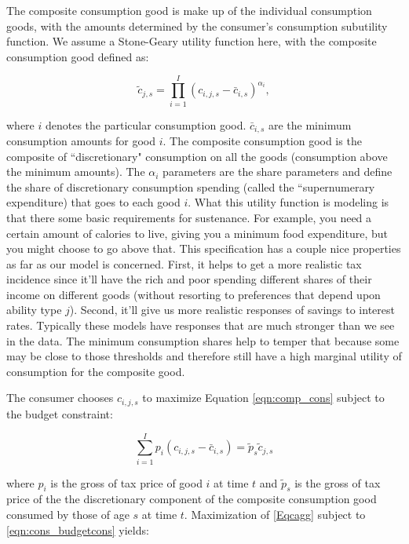 \documentclass[letterpaper,12pt]{article}
\theoremstyle{definition}
\begin{document}
\begin{spacing}{1.5}
  The composite consumption good is make up of the individual consumption goods, with the amounts determined by the consumer's consumption subutility function.  We assume a Stone-Geary utility function here, with the composite consumption good defined as: 
  
  \begin{equation} \label{eqn:comp_cons}
\tilde{c}_{j,s}  = \prod_{i=1}^I \left( c_{i,j,s} - \bar{c}_{i,s} \right) ^{\alpha_{i}}, 
 \end{equation}
 
 \noindent\noindent where $i$ denotes the particular consumption good.  $\bar{c}_{i,s}$ are the minimum consumption amounts for good $i$.  The composite consumption good is the composite of ``discretionary" consumption on all the goods (consumption above the minimum amounts).  The $\alpha_{i}$ parameters are the share parameters and define the share of discretionary consumption spending (called the ``supernumerary expenditure) that goes to each good $i$.  What this utility function is modeling is that there some basic requirements for sustenance.  For example, you need a certain amount of calories to live, giving you a minimum food expenditure, but you might choose to go above that.  This specification has a couple nice properties as far as our model is concerned.  First, it helps to get a more realistic tax incidence since it'll have the rich and poor spending different shares of their income on different goods (without resorting to preferences that depend upon ability type $j$).  Second, it'll give us more realistic responses of savings to interest rates.  Typically these models have responses that are much stronger than we see in the data.  The minimum consumption shares help to temper that because some may be close to those thresholds and therefore still have a high marginal utility of consumption for the composite good.
 
The consumer chooses $c_{i,j,s}$ to maximize Equation \ref{eqn:comp_cons} subject to the budget constraint:

    \begin{equation} \label{eqn:cons_budgetcons}
        \sum_{i=1}^{I} p_{i}(c_{i,j,s}-\bar{c}_{i,s})  = \tilde{p}_{s}\tilde{c}_{j,s}
    \end{equation}

\noindent where $p_{i}$ is the gross of tax price of good $i$ at time $t$ and $\tilde{p}_{s}$ is the gross of tax price of the the discretionary component of the composite consumption good consumed by those of age $s$ at time $t$.  Maximization of \ref{Eqcagg} subject to \ref{eqn:cons_budgetcons} yields:


\end{spacing}
\end{document}
